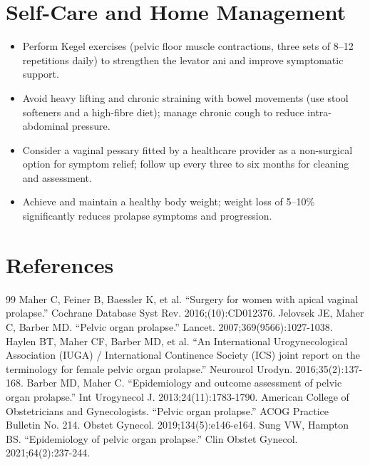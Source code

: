 \section*{Self-Care and Home Management}
\begin{itemize}
  \item Perform Kegel exercises (pelvic floor muscle contractions, three sets of 8--12 repetitions daily) to strengthen the levator ani and improve symptomatic support.
  \item Avoid heavy lifting and chronic straining with bowel movements (use stool softeners and a high-fibre diet); manage chronic cough to reduce intra-abdominal pressure.
  \item Consider a vaginal pessary fitted by a healthcare provider as a non-surgical option for symptom relief; follow up every three to six months for cleaning and assessment.
  \item Achieve and maintain a healthy body weight; weight loss of 5--10\% significantly reduces prolapse symptoms and progression.
\end{itemize}

\section*{References}
\begin{thebibliography}{99}
 Maher C, Feiner B, Baessler K, et al. ``Surgery for women with apical vaginal prolapse.'' Cochrane Database Syst Rev. 2016;(10):CD012376.
 Jelovsek JE, Maher C, Barber MD. ``Pelvic organ prolapse.'' Lancet. 2007;369(9566):1027-1038.
 Haylen BT, Maher CF, Barber MD, et al. ``An International Urogynecological Association (IUGA) / International Continence Society (ICS) joint report on the terminology for female pelvic organ prolapse.'' Neurourol Urodyn. 2016;35(2):137-168.
 Barber MD, Maher C. ``Epidemiology and outcome assessment of pelvic organ prolapse.'' Int Urogynecol J. 2013;24(11):1783-1790.
 American College of Obstetricians and Gynecologists. ``Pelvic organ prolapse.'' ACOG Practice Bulletin No. 214. Obstet Gynecol. 2019;134(5):e146-e164.
 Sung VW, Hampton BS. ``Epidemiology of pelvic organ prolapse.'' Clin Obstet Gynecol. 2021;64(2):237-244.
\end{thebibliography}

